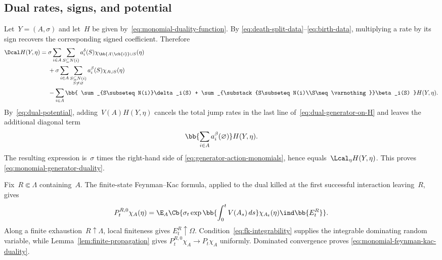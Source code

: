 \subsection{Dual rates, signs, and potential}
\label{app:dual-data}

Let~$Y=(A,\sigma)$ and let~$H$ be given
by~\eqref{eq:monomial-duality-function}. By
\eqref{eq:death-split-data}--\eqref{eq:birth-data}, multiplying a rate by its
sign recovers the corresponding signed coefficient. Therefore
\begin{equation}
\label{eq:dual-generator-on-H}
\begin{aligned}
\Dcal H(Y,\eta)
={}&
\sigma
\sum_{i\in A}\sum_{S\subseteq N(i)}
a_i^\delta(S)
\chi_{\bb{A\setminus\cb{i}}\cup S}(\eta)
\\
&+
\sigma
\sum_{i\in A}
\sum_{\substack{S\subseteq N(i)\\S\neq\varnothing}}
a_i^\beta(S)
\chi_{A\cup S}(\eta)
\\
&-
\sum_{i\in A}
\bb{
\sum_{S\subseteq N(i)}\delta_i(S)
+
\sum_{\substack{S\subseteq N(i)\\S\neq\varnothing}}\beta_i(S)
}H(Y,\eta).
\end{aligned}
\end{equation}
By~\eqref{eq:dual-potential}, adding~$V(A)H(Y,\eta)$ cancels the total jump
rates in the last line of~\eqref{eq:dual-generator-on-H} and leaves the
additional diagonal term
\begin{equation*}
\bb{\sum_{i\in A}a_i^\beta(\varnothing)}H(Y,\eta).
\end{equation*}
The resulting expression is~$\sigma$ times the right-hand side of
\eqref{eq:generator-action-monomials}, hence
equals~$\Lcal_\eta H(Y,\eta)$. This proves
\eqref{eq:monomial-generator-duality}.

Fix~$R\Subset\Lambda$ containing~$A$. The finite-state Feynman--Kac formula,
applied to the dual killed at the first successful interaction leaving~$R$,
gives
\begin{equation*}
P_t^{R,0}\chi_A(\eta)
=
\E_A\Cb{
\sigma_t
\exp\bb{\int_0^tV(A_s)\,ds}
\chi_{A_t}(\eta)
\ind\bb{E_t^R}
}.
\end{equation*}
Along a finite exhaustion~$R\uparrow\Lambda$, local finiteness gives
$E_t^R\uparrow\Omega$. Condition~\eqref{eq:fk-integrability} supplies the
integrable dominating random variable, while
Lemma~\ref{lem:finite-propagation} gives
$P_t^{R,0}\chi_A\to P_t\chi_A$ uniformly. Dominated convergence proves
\eqref{eq:monomial-feynman-kac-duality}.
